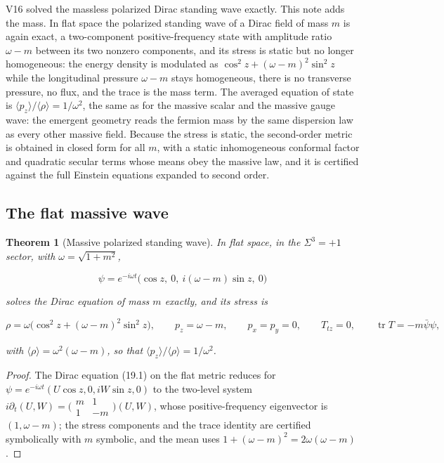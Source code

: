 \documentclass[11pt]{article}
\newtheorem{theorem}{Theorem}[section]
\theoremstyle{remark}
\begin{document}
V16 solved the massless polarized Dirac standing wave exactly.  This
note adds the mass.  In flat space the polarized standing wave of a
Dirac field of mass \(m\) is again exact, a two-component
positive-frequency state with amplitude ratio \(\omega-m\) between
its two nonzero components, and its stress is static but no longer
homogeneous: the energy density is modulated as
\(\cos^2z+(\omega-m)^2\sin^2z\) while the longitudinal pressure
\(\omega-m\) stays homogeneous, there is no transverse pressure, no
flux, and the trace is the mass term.  The averaged equation of
state is \(\langle p_z\rangle/\langle\rho\rangle=1/\omega^2\), the same
as for the massive scalar and the massive gauge wave: the emergent
geometry reads the fermion mass by the same dispersion law as every
other massive field.  Because the stress is static, the second-order
metric is obtained in closed form for all \(m\), with a static
inhomogeneous conformal factor and quadratic secular terms whose means
obey the massive law, and it is certified against the full Einstein
equations expanded to second order.

\subsection{The flat massive wave}

\begin{theorem}[Massive polarized standing wave]
\label{thm:v20v17-wave}
In flat space, in the \(\Sigma^3=+1\) sector, with \(\omega=\sqrt{1+m^2}\),

\[
 \psi=e^{-i\omega t}\bigl(\cos z,\ 0,\ i(\omega-m)\sin z,\ 0\bigr)         \tag{20.1}
\]

solves the Dirac equation of mass \(m\) exactly, and its stress is

\[
 \rho=\omega\bigl(\cos^2z+(\omega-m)^2\sin^2z\bigr),\qquad p_z=\omega-m,\qquad
 p_x=p_y=0,\qquad T_{tz}=0,\qquad \operatorname{tr}T=-m\bar\psi\psi,       \tag{20.2}
\]

with \(\langle\rho\rangle=\omega^2(\omega-m)\), so that
\(\langle p_z\rangle/\langle\rho\rangle=1/\omega^2\).
\end{theorem}

\begin{proof}
The Dirac equation (19.1) on the flat metric reduces for
\(\psi=e^{-i\omega t}(U\cos z,0,iW\sin z,0)\) to the two-level system
\(i\partial_t(U,W)=\bigl(\begin{smallmatrix}m&1\\1&-m\end{smallmatrix}\bigr)(U,W)\),
whose positive-frequency eigenvector is \((1,\omega-m)\); the stress
components and the trace identity are certified symbolically with
\(m\) symbolic, and the mean uses \(1+(\omega-m)^2=2\omega(\omega-m)\).
\end{proof}
\end{document}
